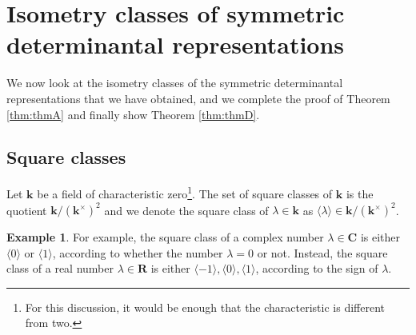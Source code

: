 \documentclass[12pt]{amsart}
\newcounter{thmcounter}
\numberwithin{equation}{section}
\numberwithin{thmcounter}{section}
\theoremstyle{definition}
\newtheorem{example}[thmcounter]{Example}
\theoremstyle{claim}
\newcommand{\nR}{\mathbf{R}}
\newcommand{\nC}{\mathbf{C}}
\newcommand{\kk}{\mathbf{k}}
\begin{document}
\section{Isometry classes of symmetric determinantal representations}\label{sec:signatures}
\noindent We now look at the isometry classes of the symmetric determinantal representations that we have obtained, and we complete the proof of Theorem \ref{thm:thmA} and finally show Theorem \ref{thm:thmD}.

\subsection{Square classes} Let $\kk$ be a field of characteristic zero\footnote{For this discussion, it would be enough that the characteristic is different from two.}. The set of square classes of $\kk$ is the quotient $\kk/(\kk^{\times})^2$ and we denote the square class of $\lambda\in \kk$ as $\langle \lambda \rangle \in \kk/(\kk^{\times})^2$.

\begin{example}
For example, the square class of a complex number $\lambda\in \nC$ is either $\langle 0 \rangle$ or $\langle 1 \rangle$, according to whether the number $\lambda=0$ or not. Instead, the square class of a real number $\lambda \in \nR$ is either $\langle -1 \rangle,\langle 0 \rangle,\langle 1 \rangle$, according to the sign of $\lambda$.
\end{example}
\end{document}
